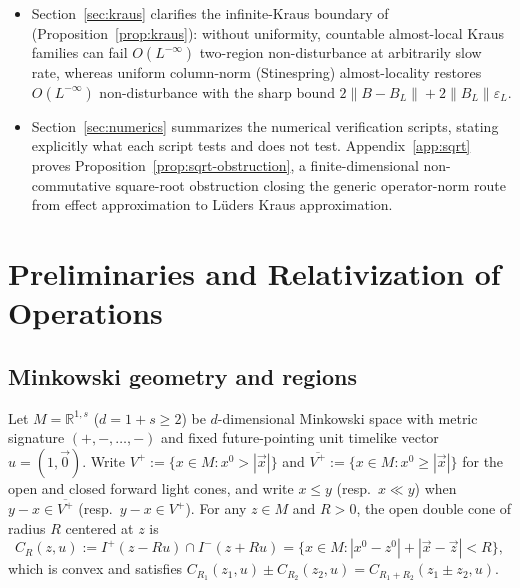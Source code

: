 \documentclass[11pt,a4paper]{article}
\theoremstyle{definition}
\theoremstyle{remark}
\newcommand{\RR}{\mathbb{R}}
\newcommand{\norm}[1]{\|#1\|}
\begin{document}
\begin{itemize}[leftmargin=*,nosep]
\item Section~\ref{sec:kraus} clarifies the infinite-Kraus boundary of~\cite[Def.~4.3 and Prop.~4.4(ii)]{FewsterLoveridge2026} (Proposition~\ref{prop:kraus}): without uniformity, countable almost-local Kraus families can fail $O(L^{-\infty})$ two-region non-disturbance at arbitrarily slow rate, whereas uniform column-norm (Stinespring) almost-locality restores $O(L^{-\infty})$ non-disturbance with the sharp bound $2\norm{B-B_L}+2\norm{B_L}\varepsilon_L$.
\item Section~\ref{sec:numerics} summarizes the numerical verification scripts, stating explicitly what each script tests and does not test. Appendix~\ref{app:sqrt} proves Proposition~\ref{prop:sqrt-obstruction}, a finite-dimensional non-commutative square-root obstruction closing the generic operator-norm route from effect approximation to L\"uders Kraus approximation.
\end{itemize}

\section{Preliminaries and Relativization of Operations}
\label{sec:prelim}

\subsection{Minkowski geometry and regions}
Let $M = \RR^{1,s}$ ($d = 1+s \ge 2$) be $d$-dimensional Minkowski space with metric signature $(+,-,\dots,-)$ and fixed future-pointing unit timelike vector $u = (1,\vec{0})$. Write $V^+ := \{x\in M : x^0 > |\vec{x}|\}$ and $\overline{V^+} := \{x\in M : x^0 \ge |\vec{x}|\}$ for the open and closed forward light cones, and write $x \le y$ (resp.\ $x \ll y$) when $y - x \in \overline{V^+}$ (resp.\ $y - x \in V^+$). For any $z\in M$ and $R>0$, the open double cone of radius $R$ centered at $z$ is
\[
C_R(z,u) := I^+(z - Ru) \cap I^-(z + Ru) = \bigl\{x \in M : |x^0 - z^0| + |\vec{x} - \vec{z}| < R\bigr\},
\]
which is convex and satisfies $C_{R_1}(z_1,u) \pm C_{R_2}(z_2,u) = C_{R_1+R_2}(z_1\pm z_2, u)$.
\end{document}
